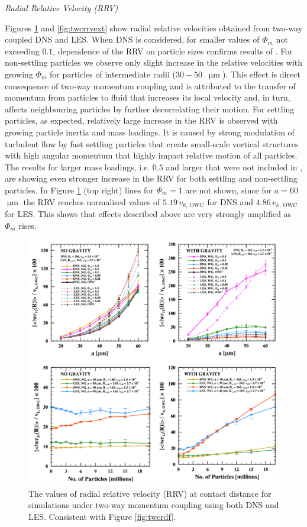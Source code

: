 \documentclass{pracamgren}
\begin{document}
\medskip

\emph{Radial Relative Velocity (RRV)}

Figures \ref{fig:twcrrv} and \ref{fig:twcrrvext} show radial relative velocities obtained from two-way coupled DNS and LES.
When DNS is considered, for smaller values of $\Phi_m$ not exceeding $0.1$, dependence of the RRV on particle sizes confirms results of \textcite[Fig. 22 therein]{Rosa2020}.
For non-settling particles we observe only slight increase in the relative velocities with growing $\Phi_m$ for particles of intermediate radii ($30-50$~$\upmu\text{m}$).
This effect is direct consequence of two-way momentum coupling and is attributed to the transfer of momentum from particles to fluid that increases its local velocity and, in turn, affects neighbouring particles by further decorrelating their motion.
For settling particles, as expected, relatively large increase in the RRV is observed with growing particle inertia and mass loadings.
It is caused by strong modulation of turbulent flow by fast settling particles that create small-scale vortical structures with high angular momentum that highly impact relative motion of all particles.
The results for larger mass loadings, i.e. $0.5$ and larger that were not included in \textcite{Rosa2020}, are showing even stronger increase in the RRV for both settling and non-settling particles.
In Figure \ref{fig:twcrrv} (top right) lines for $\Phi_m=1$ are not shown, since for $a = 60$~$\upmu\text{m}$ the RRV reaches normalised values of $5.19 \, v_{k, \, \text{OWC}}$ for DNS and $4.86 \, v_{k, \, \text{OWC}}$ for LES.
This shows that effects described above are very strongly amplified as $\Phi_m$ rises.

\begin{figure}[ht]
\centering
\includegraphics[width=13.5cm]{figures/2-10_twcrrv.pdf}
\caption{
The values of radial relative velocity (RRV) at contact distance for simulations under two-way momentum coupling using both DNS and LES.
Consistent with Figure \ref{fig:twcrdf}.
}
\label{fig:twcrrv}
\end{figure}
\end{document}
